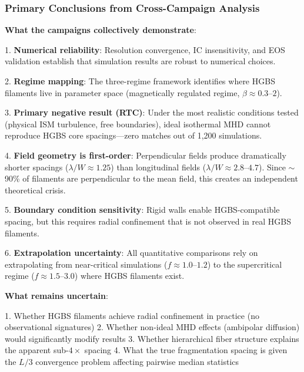 \documentclass[twocolumn]{mnras}
\begin{document}
\subsubsection{Primary Conclusions from Cross-Campaign Analysis}

\textbf{What the campaigns collectively demonstrate}:

1. \textbf{Numerical reliability}: Resolution convergence, IC insensitivity, and EOS validation establish that simulation results are robust to numerical choices.

2. \textbf{Regime mapping}: The three-regime framework identifies where HGBS filaments live in parameter space (magnetically regulated regime, $\beta \approx 0.3$--$2$).

3. \textbf{Primary negative result (RTC)}: Under the most realistic conditions tested (physical ISM turbulence, free boundaries), ideal isothermal MHD cannot reproduce HGBS core spacings—zero matches out of 1,200 simulations.

4. \textbf{Field geometry is first-order}: Perpendicular fields produce dramatically shorter spacings ($\lambda/W \approx 1.25$) than longitudinal fields ($\lambda/W \approx 2.8$--$4.7$). Since $\sim$90\% of filaments are perpendicular to the mean field, this creates an independent theoretical crisis.

5. \textbf{Boundary condition sensitivity}: Rigid walls enable HGBS-compatible spacing, but this requires radial confinement that is not observed in real HGBS filaments.

6. \textbf{Extrapolation uncertainty}: All quantitative comparisons rely on extrapolating from near-critical simulations ($f \approx 1.0$--$1.2$) to the supercritical regime ($f \approx 1.5$--$3.0$) where HGBS filaments exist.

\textbf{What remains uncertain}:

1. Whether HGBS filaments achieve radial confinement in practice (no observational signatures)
2. Whether non-ideal MHD effects (ambipolar diffusion) would significantly modify results
3. Whether hierarchical fiber structure explains the apparent sub-$4\times$ spacing
4. What the true fragmentation spacing is given the $L/3$ convergence problem affecting pairwise median statistics
\end{document}
